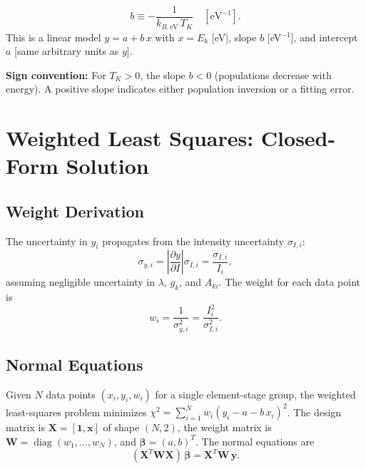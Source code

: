 \documentclass[11pt]{article}
\newcommand{\kbeV}{k_{B,\text{eV}}}
\begin{document}
\begin{equation}
  \boxed{b \equiv -\frac{1}{\kbeV\,T_K} \quad [\text{eV}^{-1}].}
  \label{eq:slope}
\end{equation}
This is a linear model $y = a + b\,x$ with $x = E_k$ [eV], slope $b$ [eV$^{-1}$],
and intercept $a$ [same arbitrary units as $y$].

\textbf{Sign convention:} For $T_K > 0$, the slope $b < 0$ (populations decrease
with energy). A positive slope indicates either population inversion or a fitting error.


\section{Weighted Least Squares: Closed-Form Solution}
\label{sec:wls}

\subsection{Weight Derivation}

The uncertainty in $y_i$ propagates from the intensity uncertainty $\sigma_{I,i}$:
\begin{equation}
  \sigma_{y,i} = \left|\frac{\partial y}{\partial I}\right|\sigma_{I,i}
  = \frac{\sigma_{I,i}}{I_i},
  \label{eq:sigma_y}
\end{equation}
assuming negligible uncertainty in $\lambda$, $g_k$, and $A_{ki}$.
The weight for each data point is
\begin{equation}
  w_i = \frac{1}{\sigma_{y,i}^2} = \frac{I_i^2}{\sigma_{I,i}^2}.
  \label{eq:weights}
\end{equation}


\subsection{Normal Equations}

Given $N$ data points $(x_i, y_i, w_i)$ for a single element-stage group,
the weighted least-squares problem minimizes
$\chi^2 = \sum_{i=1}^N w_i (y_i - a - b\,x_i)^2$.
The design matrix is $\mathbf{X} = [\mathbf{1}, \mathbf{x}]$ of shape $(N, 2)$,
the weight matrix is $\mathbf{W} = \operatorname{diag}(w_1, \ldots, w_N)$,
and $\boldsymbol{\beta} = (a, b)^T$. The normal equations are
\begin{equation}
  (\mathbf{X}^T \mathbf{W} \mathbf{X})\,\boldsymbol{\beta}
  = \mathbf{X}^T \mathbf{W}\,\mathbf{y}.
  \label{eq:normal_eq}
\end{equation}
\end{document}
